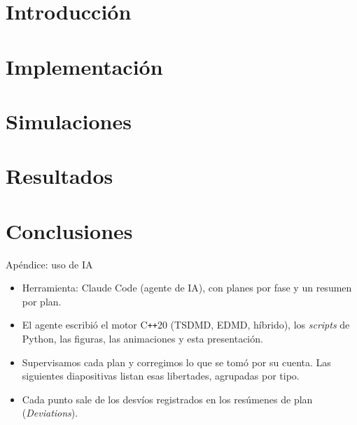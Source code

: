 \section{Introducción}


\section{Implementación}


\section{Simulaciones}


\section{Resultados}


\section{Conclusiones}


\appendix

\begin{frame}{Apéndice: uso de IA}
  \small
  \begin{itemize}
    \item Herramienta: Claude Code (agente de IA), con planes por fase y un resumen por plan.
    \item El agente escribió el motor C\texttt{++}20 (TSDMD, EDMD, híbrido), los \emph{scripts} de
      Python, las figuras, las animaciones y esta presentación.
    \item Supervisamos cada plan y corregimos lo que se tomó por su cuenta. Las siguientes
      diapositivas listan esas libertades, agrupadas por tipo.
    \item Cada punto sale de los desvíos registrados en los resúmenes de plan (\emph{Deviations}).
  \end{itemize}
\end{frame}


